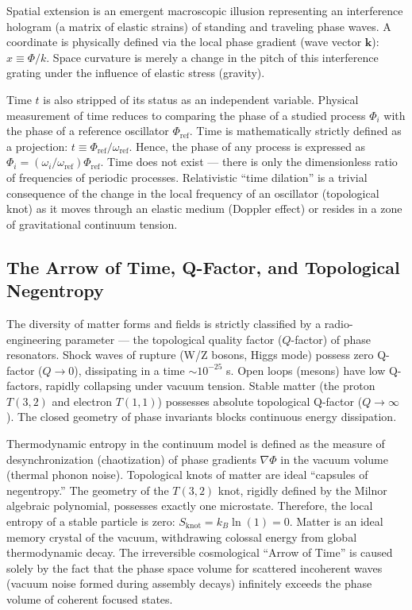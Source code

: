 \documentclass[12pt,a4paper]{article}
\begin{document}
Spatial extension is an emergent macroscopic illusion representing an interference hologram (a matrix of elastic strains) of standing and traveling phase waves. A coordinate is physically defined via the local phase gradient (wave vector $\mathbf{k}$): $x \equiv \Phi / k$. Space curvature is merely a change in the pitch of this interference grating under the influence of elastic stress (gravity).

Time $t$ is also stripped of its status as an independent variable. Physical measurement of time reduces to comparing the phase of a studied process $\Phi_i$ with the phase of a reference oscillator $\Phi_{\text{ref}}$. Time is mathematically strictly defined as a projection: $t \equiv \Phi_{\text{ref}} / \omega_{\text{ref}}$. Hence, the phase of any process is expressed as $\Phi_i = (\omega_i / \omega_{\text{ref}}) \Phi_{\text{ref}}$. 
Time does not exist — there is only the dimensionless ratio of frequencies of periodic processes. Relativistic ``time dilation'' is a trivial consequence of the change in the local frequency of an oscillator (topological knot) as it moves through an elastic medium (Doppler effect) or resides in a zone of gravitational continuum tension.

\subsection{The Arrow of Time, Q-Factor, and Topological Negentropy}
The diversity of matter forms and fields is strictly classified by a radio-engineering parameter — the topological quality factor ($Q$-factor) of phase resonators. 
Shock waves of rupture (W/Z bosons, Higgs mode) possess zero Q-factor ($Q \to 0$), dissipating in a time $\sim 10^{-25}$ s. Open loops (mesons) have low Q-factors, rapidly collapsing under vacuum tension. 
Stable matter (the proton $T(3,2)$ and electron $T(1,1)$) possesses absolute topological Q-factor ($Q \to \infty$). The closed geometry of phase invariants blocks continuous energy dissipation.

Thermodynamic entropy in the continuum model is defined as the measure of desynchronization (chaotization) of phase gradients $\nabla \Phi$ in the vacuum volume (thermal phonon noise). 
Topological knots of matter are ideal ``capsules of negentropy.'' The geometry of the $T(3,2)$ knot, rigidly defined by the Milnor algebraic polynomial, possesses exactly one microstate. Therefore, the local entropy of a stable particle is zero: $S_{\text{knot}} = k_B \ln(1) = 0$. Matter is an ideal memory crystal of the vacuum, withdrawing colossal energy from global thermodynamic decay. 
The irreversible cosmological ``Arrow of Time'' is caused solely by the fact that the phase space volume for scattered incoherent waves (vacuum noise formed during assembly decays) infinitely exceeds the phase volume of coherent focused states.
\end{document}

